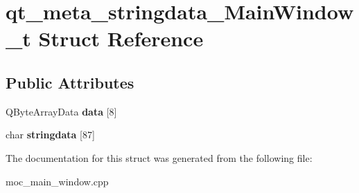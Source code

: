 \hypertarget{structqt__meta__stringdata__MainWindow__t}{\section{qt\-\_\-meta\-\_\-stringdata\-\_\-\-Main\-Window\-\_\-t Struct Reference}
\label{structqt__meta__stringdata__MainWindow__t}
}
\subsection*{Public Attributes}
\begin{DoxyCompactItemize}
\item 
\hypertarget{structqt__meta__stringdata__MainWindow__t_ae8888f3a82b4bd7597ba5dad592aeec6}{Q\-Byte\-Array\-Data {\bfseries data} \mbox{[}8\mbox{]}}\label{structqt__meta__stringdata__MainWindow__t_ae8888f3a82b4bd7597ba5dad592aeec6}

\item 
\hypertarget{structqt__meta__stringdata__MainWindow__t_a7496e4b9ffe53f363732b8db099c8b9a}{char {\bfseries stringdata} \mbox{[}87\mbox{]}}\label{structqt__meta__stringdata__MainWindow__t_a7496e4b9ffe53f363732b8db099c8b9a}

\end{DoxyCompactItemize}


The documentation for this struct was generated from the following file\-:\begin{DoxyCompactItemize}
\item 
moc\-\_\-main\-\_\-window.\-cpp\end{DoxyCompactItemize}
